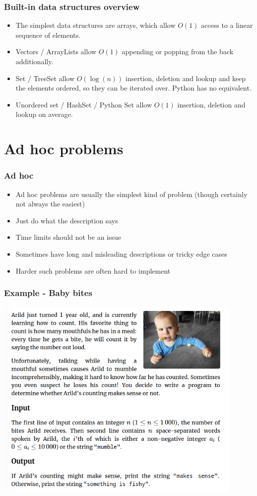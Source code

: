 \documentclass{beamer}
\begin{document}
\begin{frame}[plain]
    \frametitle{Built-in data structures overview}
    \begin{itemize}
        \item The simplest data structures are arrays, which allow $O(1)$ access to a linear sequence of elements.
        \item Vectors / ArrayLists allow $O(1)$ appending or popping from the back additionally.
        \item Set / TreeSet allow $O(\log(n))$ insertion, deletion and lookup and keep the elements ordered, so they can be iterated over. Python has no equivalent.
        \item Unordered set / HashSet / Python Set allow $O(1)$ insertion, deletion and lookup on average.
    \end{itemize}
\end{frame}


\section*{Ad hoc problems}

\begin{frame}[plain]
    \frametitle{Ad hoc}
    \begin{itemize}
        \item Ad hoc problems are usually the simplest kind of problem (though certainly not always the easiest)
        \item Just do what the description says
        \item Time limits should not be an issue
        \item Sometimes have long and misleading descriptions or tricky edge cases
        \item Harder such problems are often hard to implement
    \end{itemize}
\end{frame}

\begin{frame}[plain]
    \frametitle{Example - Baby bites}
    \begin{center}
    		\includegraphics[width=0.9\textwidth]{babybites}
    	\end{center}
\end{frame}
\end{document}
